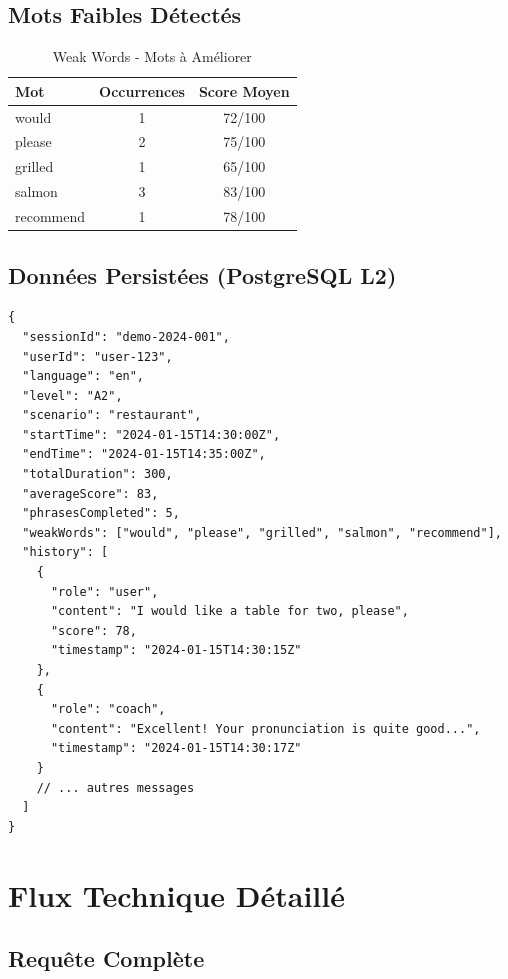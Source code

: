 \documentclass[12pt,a4paper,oneside]{report}
\begin{document}
\section{Mots Faibles Détectés}

\begin{table}[H]
\centering
\caption{Weak Words - Mots à Améliorer}
\label{tab:weak_words}
\begin{tabular}{|l|c|c|}
\hline
\textbf{Mot} & \textbf{Occurrences} & \textbf{Score Moyen} \\
\hline
would & 1 & 72/100 \\
\hline
please & 2 & 75/100 \\
\hline
grilled & 1 & 65/100 \\
\hline
salmon & 3 & 83/100 \\
\hline
recommend & 1 & 78/100 \\
\hline
\end{tabular}
\end{table}

\section{Données Persistées (PostgreSQL L2)}

\begin{lstlisting}[caption=Données de Session - Format JSON,label=lst:session_data]
{
  "sessionId": "demo-2024-001",
  "userId": "user-123",
  "language": "en",
  "level": "A2",
  "scenario": "restaurant",
  "startTime": "2024-01-15T14:30:00Z",
  "endTime": "2024-01-15T14:35:00Z",
  "totalDuration": 300,
  "averageScore": 83,
  "phrasesCompleted": 5,
  "weakWords": ["would", "please", "grilled", "salmon", "recommend"],
  "history": [
    {
      "role": "user",
      "content": "I would like a table for two, please",
      "score": 78,
      "timestamp": "2024-01-15T14:30:15Z"
    },
    {
      "role": "coach",
      "content": "Excellent! Your pronunciation is quite good...",
      "timestamp": "2024-01-15T14:30:17Z"
    }
    // ... autres messages
  ]
}
\end{lstlisting}

\newpage

\chapter{Flux Technique Détaillé}

\section{Requête Complète}
\end{document}
